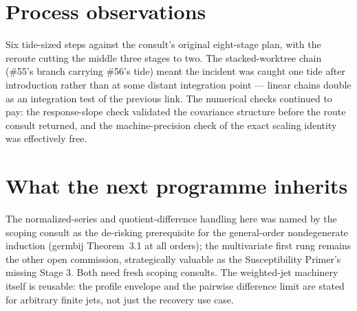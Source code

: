 \documentclass[11pt]{article}
\begin{document}
\section{Process observations}

Six tide-sized steps against the consult's original eight-stage plan,
with the reroute cutting the middle three stages to two. The
stacked-worktree chain (\#55's branch carrying \#56's tide) meant the
incident was caught one tide after introduction rather than at some
distant integration point --- linear chains double as an integration
test of the previous link. The numerical checks continued to pay:
the response-slope check validated the covariance structure before
the route consult returned, and the machine-precision check of the
exact scaling identity was effectively free.

\section{What the next programme inherits}

The normalized-series and quotient-difference handling here was named
by the scoping consult as the de-risking prerequisite for the
general-order nondegenerate induction (germbij Theorem~3.1 at all
orders); the multivariate first rung remains the other open
commission, strategically valuable as the Susceptibility Primer's
missing Stage 3. Both need fresh scoping consults. The weighted-jet
machinery itself is reusable: the profile envelope and the pairwise
difference limit are stated for arbitrary finite jets, not just the
recovery use case.
\end{document}
